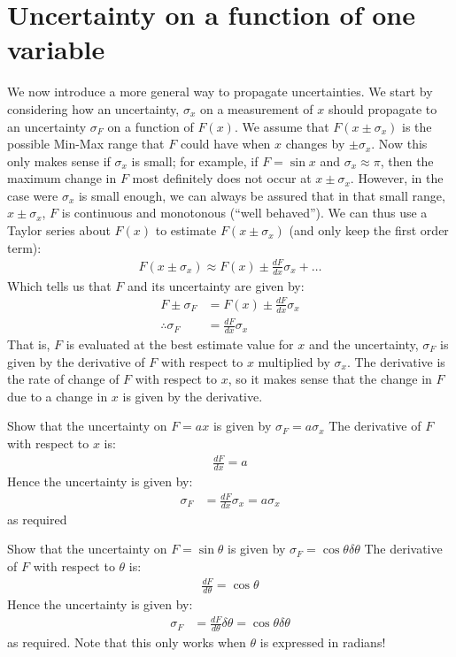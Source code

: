 \section{Uncertainty on a function of one variable}
We now introduce a more general way to propagate uncertainties. We start by considering how an uncertainty, $\sigma_{x}$ on a measurement of $x$ should propagate to an uncertainty $\sigma_{F}$ on a function of $F(x)$. We assume that $F(x \pm \sigma_{x})$ is the possible Min-Max range that $F$ could have when $x$ changes by $\pm\sigma_{x}$. Now this only makes sense if $\sigma_{x}$ is small; for example, if $F=\sin x$ and $\sigma_{x} \approx \pi$, then the maximum change in $F$ most definitely does not occur at $x\pm\sigma_{x}$. However, in the case were $\sigma_{x}$ is small enough, we can always be assured that in that small range, $x\pm\sigma_{x}$,  $F$ is continuous and monotonous (``well behaved''). We can thus use a Taylor series about $F(x)$ to estimate $F(x\pm\sigma_{x})$ (and only keep the first order term):
\begin{align}
F(x\pm\sigma_{x})\approx F(x)\pm\frac{dF}{dx}\sigma_{x}+\dots
\end{align}
Which tells us that $F$ and its uncertainty are given by:
\begin{align}
F \pm \sigma_{F} &= F(x) \pm \frac{dF}{dx}\sigma_{x}\nonumber\\
\therefore \sigma_{F}&=\frac{dF}{dx} \sigma_{x}
\end{align}
That is, $F$ is evaluated at the best estimate value for $x$ and the uncertainty, $\sigma_{F}$ is given by the derivative of $F$ with respect to $x$ multiplied by $\sigma_{x}$.  The derivative is the rate of change of $F$ with respect to $x$, so it makes sense that the change in $F$ due to a change in $x$ is given by the derivative.

\begin{example}{}{Show that the uncertainty on $F=ax$ is given by $\sigma_{F}=a \sigma_{x}$}{}
The derivative of $F$ with respect to $x$ is:
\begin{align*}
\frac{dF}{dx}=a
\end{align*}
Hence the uncertainty is given by:
\begin{align*}
\sigma_{F}&=\frac{dF}{dx} \sigma_{x}=a \sigma_{x}
\end{align*}
as required
\end{example}

\begin{example}{}{Show that the uncertainty on $F=\sin\theta$ is given by $\sigma_{F}=\cos\theta\delta\theta$}{}
The derivative of $F$ with respect to $\theta$ is:
\begin{align*}
\frac{dF}{d\theta}=\cos\theta
\end{align*}
Hence the uncertainty is given by:
\begin{align*}
\sigma_{F}&=\frac{dF}{d\theta} \delta \theta=\cos\theta\delta\theta
\end{align*}
as required. Note that this only works when $\theta$ is expressed in radians!
\end{example}


